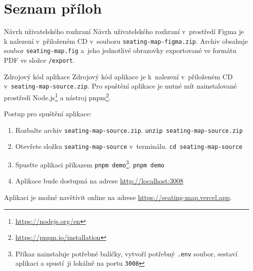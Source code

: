 \appendix
{}
\chapter*{Seznam příloh}
\renewcommand{\thesection}{Příloha \Alph{section}}

\begin{section}{Návrh uživatelského rozhraní}
    \label{appendix:ui-design}
    Návrh uživatelského rozhraní v~prostředí Figma je k nalezení v~přiloženém CD v~souboru \texttt{seating-map-figma.zip}.
    Archiv obsahuje soubor \texttt{seating-map.fig} a~jeho jednotlivé obrazovky exportované ve formátu PDF ve složce \texttt{/export}.
\end{section}
\newpage

\begin{section}{Zdrojový kód aplikace}
    \label{appendix:source-code}
    Zdrojový kód aplikace je k~nalezení v~přiloženém CD v~\texttt{seating-map-source.zip}.
    Pro spuštění aplikace je nutné mít nainstalované prostředí Node.js\footnote{\url{https://nodejs.org/en}} a nástroj pnpm\footnote{\url{https://pnpm.io/installation}}.

    Postup pro spuštění aplikace:

    \begin{enumerate}
        \item Rozbalte archiv \texttt{seating-map-source.zip}.
        \subitem \texttt{unzip seating-map-source.zip}
        \item Otevřete složku \texttt{seating-map-source} v~terminálu.
        \subitem \texttt{cd seating-map-source}
        \item Spusťte aplikaci příkazem \texttt{pnpm demo}\footnote{Příkaz nainstaluje potřebné balíčky, vytvoří potřebný \texttt{.env} soubor, sestaví aplikaci a spustí~ji lokálně na portu \texttt{3008}}.
        \subitem \texttt{pnpm demo}
        \item Aplikace bude dostupná na adrese \url{http://localhost:3008}
    \end{enumerate}

    Aplikaci je možné navštívit online na adrese \url{https://seating-map.vercel.app}.
\end{section}
